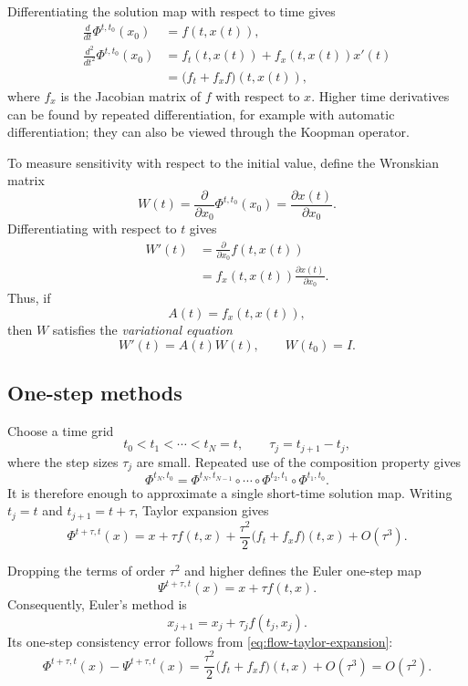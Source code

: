 Differentiating the solution map with respect to time gives
\begin{align*}
  \frac{d}{dt}\Phi^{t,t_0}(x_0)
    &=f(t,x(t)),\\
  \frac{d^2}{dt^2}\Phi^{t,t_0}(x_0)
    &=f_t(t,x(t))+f_x(t,x(t))x'(t)\\
    &=\bigl(f_t+f_xf\bigr)(t,x(t)),
\end{align*}
where $f_x$ is the Jacobian matrix of $f$ with respect to $x$. Higher
time derivatives can be found by repeated differentiation, for example
with automatic differentiation; they can also be viewed through the
Koopman operator.

To measure sensitivity with respect to the initial value, define the
Wronskian matrix
\[
  W(t)=\frac{\partial}{\partial x_0}\Phi^{t,t_0}(x_0)
      =\frac{\partial x(t)}{\partial x_0}.
\]
Differentiating with respect to $t$ gives
\begin{align*}
  W'(t)
  &=\frac{\partial}{\partial x_0}f(t,x(t))\\
  &=f_x(t,x(t))\frac{\partial x(t)}{\partial x_0}.
\end{align*}
Thus, if
\[
  A(t)=f_x(t,x(t)),
\]
then $W$ satisfies the \emph{variational equation}
\begin{equation}\label{eq:variational-equation}
  W'(t)=A(t)W(t),
  \qquad
  W(t_0)=I.
\end{equation}

\subsection{One-step methods}

Choose a time grid
\[
  t_0<t_1<\cdots<t_N=t,
  \qquad
  \tau_j=t_{j+1}-t_j,
\]
where the step sizes $\tau_j$ are small. Repeated use of the composition
property gives
\[
  \Phi^{t_N,t_0}
  =\Phi^{t_N,t_{N-1}}\circ\cdots\circ
   \Phi^{t_2,t_1}\circ\Phi^{t_1,t_0}.
\]
It is therefore enough to approximate a single short-time solution map.
Writing $t_j=t$ and $t_{j+1}=t+\tau$, Taylor expansion gives
\begin{equation}\label{eq:flow-taylor-expansion}
  \Phi^{t+\tau,t}(x)
  =x+\tau f(t,x)
   +\frac{\tau^2}{2}\bigl(f_t+f_xf\bigr)(t,x)
   +O(\tau^3).
\end{equation}

Dropping the terms of order $\tau^2$ and higher defines the Euler
one-step map
\[
  \Psi^{t+\tau,t}(x)=x+\tau f(t,x).
\]
Consequently, Euler's method is
\begin{equation}\label{eq:euler-method}
  x_{j+1}=x_j+\tau_j f(t_j,x_j).
\end{equation}
Its one-step consistency error follows from
\eqref{eq:flow-taylor-expansion}:
\[
  \Phi^{t+\tau,t}(x)-\Psi^{t+\tau,t}(x)
  =\frac{\tau^2}{2}\bigl(f_t+f_xf\bigr)(t,x)+O(\tau^3)
  =O(\tau^2).
\]
